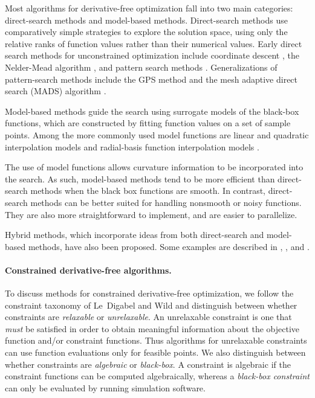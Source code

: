 \documentclass{article}
\begin{document}
Most  algorithms for derivative-free optimization fall into two main categories: direct-search methods and model-based methods.   Direct-search methods use comparatively simple strategies to explore the solution space, using only the relative ranks of function values rather than their numerical values.     Early direct search methods for unconstrained optimization include coordinate descent \cite{fermi.metropolis:numerical},  the Nelder-Mead algorithm \cite{10.1093/comjnl/7.4.308},  
and pattern search methods \cite {hooke.jeeves:direct, kolda.lewis.ea:optimization}.   Generalizations of pattern-search methods include the GPS method \cite{torczon:convergence, Audet2002AnalysisOG} and the mesh adaptive direct search (MADS) algorithm \cite{audet.dennis:mesh, abramson.audet:convergence}.

Model-based methods guide the search using surrogate models of the black-box functions, which are constructed by fitting function values on a set of sample points.    Among the more commonly used model functions are linear and quadratic interpolation models \cite{ conn.scheinberg.ea:recent, powell:uobyqa,powell:newuoa}  and radial-basis function interpolation models \cite{oeuvray.bierlaire:boosters,wild.regis.ea:orbit,wild.shoemaker:global}.

The use of model functions allows curvature information to be incorporated into the search.  As such, model-based methods tend to be more efficient than direct-search methods when the black box functions are smooth.  In contrast, direct-search methods can be better suited for handling nonsmooth or noisy functions.   They are also more straightforward to implement, and are easier to parallelize.

Hybrid methods, which incorporate ideas from both direct-search and model-based methods, have also been proposed.    Some examples are described in \cite{booker.dennis.ea:rigorous}, \cite{thi.vaz.ea:optimizing}, and \cite{custodio.vicente:using}.

\paragraph*{Constrained derivative-free algorithms.}
To discuss methods for constrained derivative-free optimization,  we follow the constraint taxonomy      
of Le~Digabel and Wild \cite{ledigabel2015taxonomy} and distinguish between whether constraints are {\em relaxable} or {\em unrelaxable}.    An unrelaxable constraint is one that {\em must} be satisfied in order to obtain meaningful information about the objective function and/or constraint functions.    Thus algorithms for unrelaxable constraints can use function evaluations only for feasible points.   We also distinguish between whether constraints are {\em algebraic} or {\em black-box}.    A constraint is algebraic if the constraint functions can be computed algebraically,  whereas a {\em black-box constraint} can only be evaluated by running simulation software.    
\end{document}
